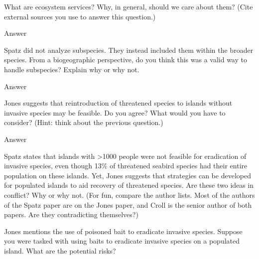 \documentclass[11pt, addpoints]{exam}
\begin{document}
\begin{questions}
\question[5]
What are ecosystem services? Why, in general, should we care about them? (Cite external sources you use to answer this question.)

\begin{solution}
	Answer
\end{solution}

\question[5]
Spatz did not analyze subspecies. They instead included them within the broader species. From a biogeographic perspective, do you think this was a valid way to handle subspecies? Explain why or why not.

\begin{solution}
	Answer
\end{solution}

\question[5]
Jones suggests that reintroduction of threatened species to islands without invasive species may be feasible. Do you agree?  What would you have to consider? (Hint: think about the previous question.)

\begin{solution}
	Answer
\end{solution}


\question[5]
Spatz states that islands with \textgreater1000 people were not feasible for eradication of invasive species, even though 13\% of threatened seabird species had their entire population on these islands. Yet, Jones suggests that strategies can be developed for populated islands to aid recovery of threatened species. Are these two ideas in conflict?  Why or why not. (For fun, compare the author lists. Most of the authors of the Spatz paper are on the Jones paper, and Croll is the senior author of both papers. Are they contradicting themselves?)


\begin{solution}
\end{solution}


\question[5]
Jones mentions the use of poisoned bait to eradicate invasive species. Suppose you were tasked with using baits to eradicate invasive species on a populated island. What are the potential risks?

\begin{solution}
	

\end{solution}
\end{questions}
\end{document}
